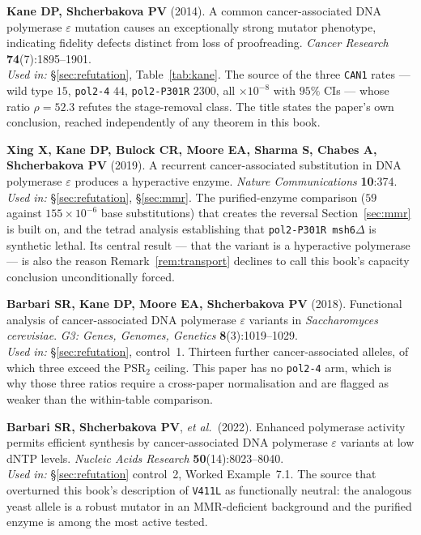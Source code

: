 \begin{refs}
\item \textbf{Kane DP, Shcherbakova PV} (2014). A common cancer-associated DNA
polymerase $\varepsilon$ mutation causes an exceptionally strong mutator
phenotype, indicating fidelity defects distinct from loss of proofreading.
\emph{Cancer Research} \textbf{74}(7):1895--1901.
\\[0.15em]
\emph{Used in:} §\ref{sec:refutation}, Table~\ref{tab:kane}. The source of the
three \texttt{CAN1} rates --- wild type $15$, \texttt{pol2-4} $44$,
\texttt{pol2-P301R} $2300$, all $\times10^{-8}$ with $95\%$ CIs --- whose ratio
$\rho = 52.3$ refutes the stage-removal class. The title states the paper's own
conclusion, reached independently of any theorem in this book.

\item \textbf{Xing X, Kane DP, Bulock CR, Moore EA, Sharma S, Chabes A,
Shcherbakova PV} (2019). A recurrent cancer-associated substitution in DNA
polymerase $\varepsilon$ produces a hyperactive enzyme. \emph{Nature
Communications} \textbf{10}:374. 
\\[0.15em]
\emph{Used in:} §\ref{sec:refutation}, §\ref{sec:mmr}. The purified-enzyme
comparison ($59$ against $155 \times 10^{-6}$ base substitutions) that creates
the reversal Section~\ref{sec:mmr} is built on, and the tetrad analysis
establishing that \texttt{pol2-P301R msh6$\Delta$} is synthetic lethal. Its
central result --- that the variant is a hyperactive polymerase --- is also the
reason Remark~\ref{rem:transport} declines to call this book's capacity
conclusion unconditionally forced.

\item \textbf{Barbari SR, Kane DP, Moore EA, Shcherbakova PV} (2018). Functional
analysis of cancer-associated DNA polymerase $\varepsilon$ variants in
\emph{Saccharomyces cerevisiae}. \emph{G3: Genes, Genomes, Genetics}
\textbf{8}(3):1019--1029. 
\\[0.15em]
\emph{Used in:} §\ref{sec:refutation}, control~1. Thirteen further
cancer-associated alleles, of which three exceed the PSR$_2$ ceiling. This paper
has no \texttt{pol2-4} arm, which is why those three ratios require a cross-paper
normalisation and are flagged as weaker than the within-table comparison.

\item \textbf{Barbari SR, Shcherbakova PV}, \emph{et al.}\ (2022). Enhanced
polymerase activity permits efficient synthesis by cancer-associated DNA
polymerase $\varepsilon$ variants at low dNTP levels. \emph{Nucleic Acids
Research} \textbf{50}(14):8023--8040. 
\\[0.15em]
\emph{Used in:} §\ref{sec:refutation} control~2, Worked Example~7.1. The source
that overturned this book's description of \texttt{V411L} as functionally
neutral: the analogous yeast allele is a robust mutator in an MMR-deficient
background and the purified enzyme is among the most active tested.


\end{refs}
